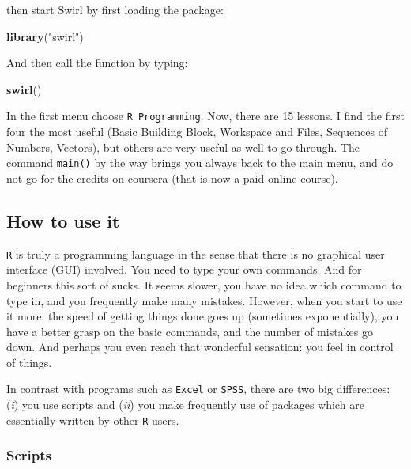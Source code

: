 \documentclass[]{article}
\newenvironment{Shaded}{\begin{snugshade}}{\end{snugshade}}
\newcommand{\KeywordTok}[1]{\textcolor[rgb]{0.13,0.29,0.53}{\textbf{#1}}}
\newcommand{\StringTok}[1]{\textcolor[rgb]{0.31,0.60,0.02}{#1}}
\newcommand{\NormalTok}[1]{#1}
\theoremstyle{definition}
\theoremstyle{definition}
\theoremstyle{definition}
\theoremstyle{remark}
\begin{document}
then start Swirl by first loading the package:

\begin{Shaded}
\begin{Highlighting}[]
\KeywordTok{library}\NormalTok{(}\StringTok{"swirl"}\NormalTok{)}
\end{Highlighting}
\end{Shaded}

And then call the function by typing:

\begin{Shaded}
\begin{Highlighting}[]
\KeywordTok{swirl}\NormalTok{()}
\end{Highlighting}
\end{Shaded}

In the first menu choose \texttt{R\ Programming}. Now, there are 15
lessons. I find the first four the most useful (Basic Building Block,
Workspace and Files, Sequences of Numbers, Vectors), but others are very
useful as well to go through. The command \texttt{main()} by the way
brings you always back to the main menu, and do not go for the credits
on coursera (that is now a paid online course).

\subsection{How to use it}\label{how-to-use-it}

\texttt{R} is truly a programming language in the sense that there is no
graphical user interface (GUI) involved. You need to type your own
commands. And for beginners this sort of sucks. It seems slower, you
have no idea which command to type in, and you frequently make many
mistakes. However, when you start to use it more, the speed of getting
things done goes up (sometimes exponentially), you have a better grasp
on the basic commands, and the number of mistakes go down. And perhaps
you even reach that wonderful sensation: you feel in control of things.

In contrast with programs such as \texttt{Excel} or \texttt{SPSS}, there
are two big differences: (\emph{i}) you use scripts and (\emph{ii}) you
make frequently use of packages which are essentially written by other
\texttt{R} users.

\subsubsection{Scripts}\label{subsec:scripts}
\end{document}
